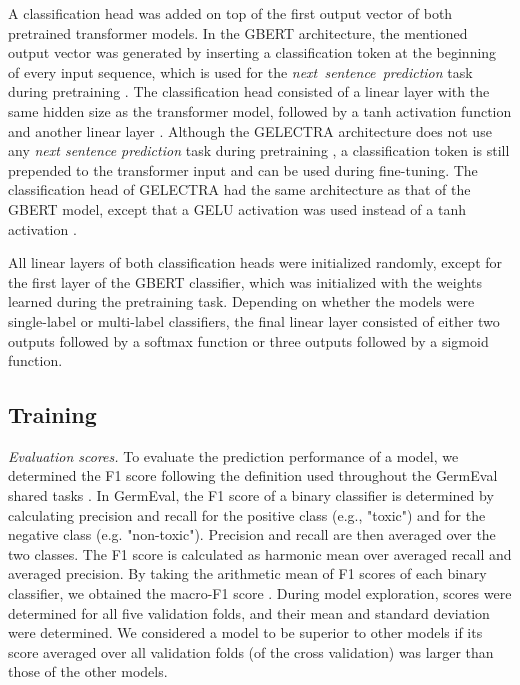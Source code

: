 \documentclass[11pt,a4paper]{article}
\begin{document}
A classification head was added on top of the first output vector of both pretrained transformer models. 
In the GBERT architecture, the mentioned output vector was generated by inserting a classification token at the beginning of every input sequence, which is used for the \mbox{\emph{next sentence prediction}} task during pretraining \cite{Devlin2018}.
The classification head consisted of a linear layer with the same hidden size as the transformer model, followed by a tanh activation function and another linear layer \cite{Wolf2020}.
Although the GELECTRA architecture does not use any \emph{next sentence prediction} task during pretraining \cite{Clark2020}, a classification token is still prepended to the transformer input and can be used during fine-tuning.
The classification head of GELECTRA had the same architecture as that of the GBERT model, except that a GELU activation \cite{Hendrycks2016} was used instead of a tanh activation \cite{Wolf2020}.

All linear layers of both classification heads were initialized randomly, except for the first layer of the GBERT classifier, which was initialized with the weights learned during the pretraining task.
Depending on whether the models were single-label or  multi-label classifiers, the final linear layer consisted of either two outputs followed by a softmax function or three outputs followed by a sigmoid function.


\subsection{Training}
\label{sec:training}

\emph{Evaluation scores.} To evaluate the prediction performance of a model, we determined the F1 score  following the definition used throughout the GermEval shared tasks \citep{Wiegand2021}. In GermEval, the F1 score of a binary classifier is determined by calculating precision and recall for the positive class (e.g., "toxic") and for the negative class (e.g. "non-toxic"). Precision and recall are then averaged over the two classes. The F1 score is calculated as harmonic mean over averaged recall and averaged precision. By taking the arithmetic mean of F1 scores of each binary classifier, we obtained the macro-F1 score .
During model exploration,  scores were determined for all five validation folds, and their mean and standard deviation were determined.
We considered a model to be superior to other models if its  score averaged over all validation folds (of the cross validation) was larger than those of the other models.
\end{document}
